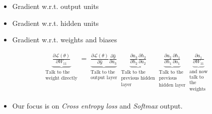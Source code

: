 \begin{frame}
  \begin{overlayarea}{\textwidth}{\textheight}
    \begin{itemize}
      \item<3-> Gradient w.r.t. output units
      \item<4-> Gradient w.r.t. hidden units
      \item<5-> Gradient w.r.t. weights and biases
    \end{itemize}

    \begin{align*}
      \underbrace{\frac{\partial \mathscr{L}(\theta)}{\partial W_{11}}}_
      {\substack{\text{Talk to the}\\ \text{weight directly}}}
      =
      \underbrace{\frac{\partial \mathscr{L}(\theta)}{\partial \hat{y}} \frac{\partial \hat{y}}{\partial a_{3}}}_
        {\substack{\text{Talk to the} \\ \text{output layer}}}
      \underbrace{\frac{\partial a_{3}}{\partial h_{2}} \frac{\partial h_{2}}{\partial a_{2}}}_
      {\substack{\text{Talk to the} \\ \text{previous hidden} \\ \text{layer}}}
      \underbrace{\frac{\partial a_{2}}{\partial h_{1}} \frac{\partial h_{1}}{\partial a_{1}}}_
      {\substack{\text{Talk to the} \\ \text{previous} \\ \text{hidden layer}}}
      \underbrace{\frac{\partial a_{1}}{\partial W_{11}}}_
      {\substack{\text{and now} \\ \text{talk to} \\ \text{the} \\ \text{weights}}}
    \end{align*}
    
    \begin{itemize}
      \item<6-> Our focus is on \textit{Cross entropy loss} and \textit{Softmax} output.
    \end{itemize}

  \end{overlayarea}
\end{frame}